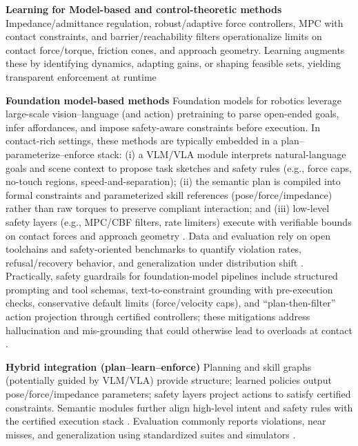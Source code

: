 \documentclass[Afour,sageh,times]{template/sagej}
\begin{document}
\textbf{Learning for Model-based and control-theoretic methods}
Impedance/admittance regulation, robust/adaptive force controllers, MPC with contact constraints, and barrier/reachability filters operationalize limits on contact force/torque, friction cones, and approach geometry. Learning augments these by identifying dynamics, adapting gains, or shaping feasible sets, yielding transparent enforcement at runtime \citep{242, 235,318,pang2023planning,242, xu_look_2021}

\textbf{Foundation model-based methods}
Foundation models for robotics leverage large-scale vision–language (and action) pretraining to parse open-ended goals, infer affordances, and impose safety-aware constraints before execution. In contact-rich settings, these methods are typically embedded in a plan–parameterize–enforce stack: (i) a VLM/VLA module interprets natural-language goals and scene context to propose task sketches and safety rules (e.g., force caps, no-touch regions, speed-and-separation); (ii) the semantic plan is compiled into formal constraints and parameterized skill references (pose/force/impedance) rather than raw torques to preserve compliant interaction; and (iii) low-level safety layers (e.g., MPC/CBF filters, rate limiters) execute with verifiable bounds on contact forces and approach geometry \citep{33,100,330}. Data and evaluation rely on open toolchains and safety-oriented benchmarks to quantify violation rates, refusal/recovery behavior, and generalization under distribution shift \citep{towers2024gymnasium,152,geng2025roboverse,gu2025robust}. Practically, safety guardrails for foundation-model pipelines include structured prompting and tool schemas, text-to-constraint grounding with pre-execution checks, conservative default limits (force/velocity caps), and “plan-then-filter” action projection through certified controllers; these mitigations address hallucination and mis-grounding that could otherwise lead to overloads at contact \citep{33,330,10705419}.


\textbf{Hybrid integration (plan–learn–enforce)}
Planning and skill graphs (potentially guided by VLM/VLA) provide structure; learned policies output pose/force/impedance parameters; safety layers project actions to satisfy certified constraints. Semantic modules further align high-level intent and safety rules with the certified execution stack \citep{geng2025roboverse,gu2025robust,330,10705419}. Evaluation commonly reports violations, near misses, and generalization using standardized suites and simulators \citep{towers2024gymnasium,raffin2021stable,152}.
\end{document}
